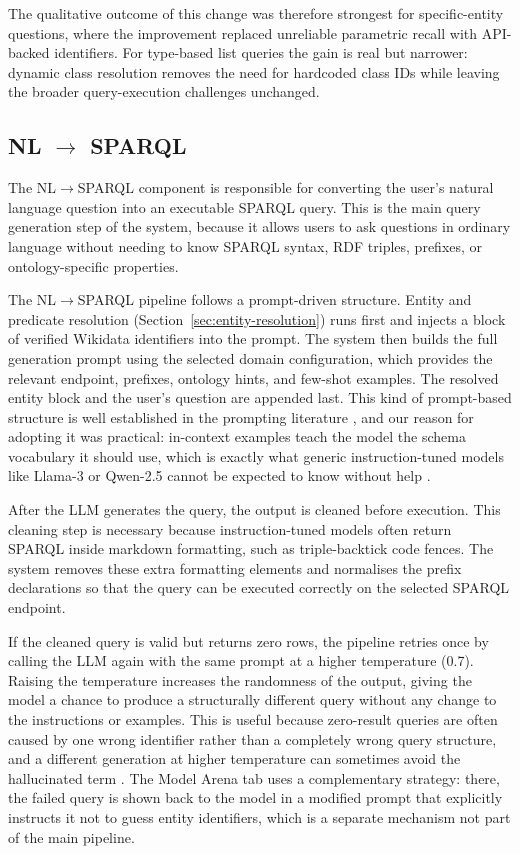 \documentclass[11pt,a4paper]{article}
\begin{document}
The qualitative outcome of this change was therefore strongest for specific-entity questions, where the improvement replaced unreliable parametric recall with API-backed identifiers. For type-based list queries the gain is real but narrower: dynamic class resolution removes the need for hardcoded class IDs while leaving the broader query-execution challenges unchanged.

\subsection{NL \texorpdfstring{$\rightarrow$}{->} SPARQL}
\label{sec:nl2sparql}

The NL$\rightarrow$SPARQL component is responsible for converting the user's natural language question into an executable SPARQL query. This is the main query generation step of the system, because it allows users to ask questions in ordinary language without needing to know SPARQL syntax, RDF triples, prefixes, or ontology-specific properties.


The NL$\rightarrow$SPARQL pipeline follows a prompt-driven structure. Entity and predicate resolution (Section~\ref{sec:entity-resolution}) runs first and injects a block of verified Wikidata identifiers into the prompt. The system then builds the full generation prompt using the selected domain configuration, which provides the relevant endpoint, prefixes, ontology hints, and few-shot examples. The resolved entity block and the user's question are appended last. This kind of prompt-based structure is well established in the prompting literature \cite{brown2020gpt3,liu2023fewshot}, and our reason for adopting it was practical: in-context examples teach the model the schema vocabulary it should use, which is exactly what generic instruction-tuned models like Llama-3 or Qwen-2.5 cannot be expected to know without help \cite{touvron2023llama2}.

After the LLM generates the query, the output is cleaned before execution. This cleaning step is necessary because instruction-tuned models often return SPARQL inside markdown formatting, such as triple-backtick code fences. The system removes these extra formatting elements and normalises the prefix declarations so that the query can be executed correctly on the selected SPARQL endpoint.

If the cleaned query is valid but returns zero rows, the pipeline retries once by calling the LLM again with the same prompt at a higher temperature (0.7). Raising the temperature increases the randomness of the output, giving the model a chance to produce a structurally different query without any change to the instructions or examples. This is useful because zero-result queries are often caused by one wrong identifier rather than a completely wrong query structure, and a different generation at higher temperature can sometimes avoid the hallucinated term \cite{ji2023hallucination,wei2022cot}. The Model Arena tab uses a complementary strategy: there, the failed query is shown back to the model in a modified prompt that explicitly instructs it not to guess entity identifiers, which is a separate mechanism not part of the main pipeline.
\end{document}
